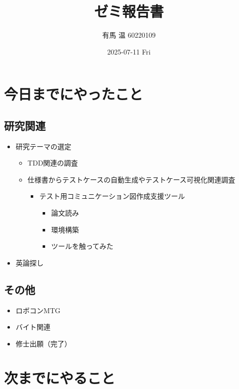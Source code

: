 \documentclass[uplatex, onecolumn, 10pt]{jsarticle}
\begin{document}
\title{\vspace{-40mm}\bf{\LARGE{ゼミ報告書}}}
\author{\vspace{-40mm}有馬 温  60220109}
\date{2025-07-11 Fri}
\maketitle


\section{今日までにやったこと}

\subsection*{研究関連}
\begin{itemize}
    \item 研究テーマの選定
    \begin{itemize}
        \item TDD関連の調査
        \item 仕様書からテストケースの自動生成やテストケース可視化関連調査
            \begin{itemize}
                \item テスト用コミュニケーション図作成支援ツール
                    \begin{itemize}
                        \item 論文読み
                        \item 環境構築
                        \item ツールを触ってみた
                    \end{itemize}
            \end{itemize}
    \end{itemize}
    \item 英論探し
\end{itemize}

\subsection*{その他}
\begin{itemize}
	\item ロボコンMTG
    \item バイト関連
    \item 修士出願（完了）
\end{itemize}



\section{次までにやること}
\end{document}

